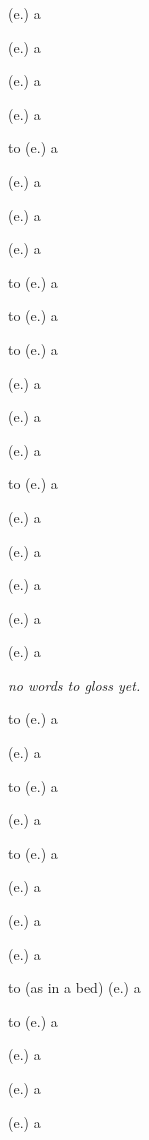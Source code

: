 \begin{glosses}
\par {} (e.) {a}
\par {} (e.) {a}
\par {} (e.) {a}
\par {} (e.) {a}
\par to  (e.) {a}
\par {} (e.) {a}
\par {} (e.) {a}
\par {} (e.) {a}
\par to  (e.) {a}
\par to  (e.) {a}
\par to  (e.) {a}
\par {} (e.) {a}
\par {} (e.) {a}
\par {} (e.) {a}
\par to  (e.) {a}
\par {} (e.) {a}
\end{glosses}

\begin{glosses}
\par {} (e.) {a}
\par {} (e.) {a}
\par {} (e.) {a}
\par {} (e.) {a}
\end{glosses}

\begin{glosses}
\par \textit{no words to gloss yet.}
\end{glosses}

\begin{glosses}
\par to  (e.) {a}
\par {} (e.) {a}
\par to  (e.) {a}
\end{glosses}

\begin{glosses}
\par {} (e.) {a}
\par to  (e.) {a}
\par {} (e.) {a}
\par {} (e.) {a}
\par {} (e.) {a}
\par to  (as in a bed) (e.) {a}
\par to  (e.) {a}
\par {} (e.) {a}
\par {} (e.) {a}
\par {} (e.) {a}
\end{glosses}

